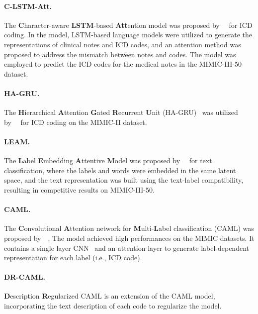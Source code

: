 \documentclass{article}
\begin{document}
\paragraph{C-LSTM-Att.} The \textbf{C}haracter-aware \textbf{LSTM}-based \textbf{Att}ention model was proposed by~\citeauthor{shi2017towards}~ for ICD coding. In the model, LSTM-based language models were utilized to generate the representations of clinical notes and ICD codes, and an attention method was proposed to address the mismatch between notes and codes. The model was employed to predict the ICD codes for the medical notes in the MIMIC-III-50 dataset.

\paragraph{HA-GRU.} The
\textbf{H}ierarchical \textbf{A}ttention \textbf{G}ated \textbf{R}ecurrent \textbf{U}nit (HA-GRU)~\cite{yang2016hierarchical} was utilized by~\citeauthor{baumel2018multi}~ for ICD coding  on the MIMIC-II dataset.

\paragraph{LEAM.} The \textbf{L}abel \textbf{E}mbedding \textbf{A}ttentive \textbf{M}odel was proposed by~\citeauthor{wang2018joint}~ for text classification, where the labels and words were embedded in the same latent space, and the text representation was built using the text-label compatibility, resulting in competitive results on MIMIC-III-50.

\paragraph{CAML.} The \textbf{C}onvolutional \textbf{A}ttention network for \textbf{M}ulti-\textbf{L}abel classification (CAML) was proposed by~\citeauthor{mullenbach2018}~. The model achieved high performances on the MIMIC datasets. It contains a single layer CNN~\cite{kim2014convolutional} and an attention layer to generate label-dependent representation for each label (i.e., ICD code).

\paragraph{DR-CAML.} \textbf{D}escription \textbf{R}egularized CAML \cite{mullenbach2018} is an extension of the CAML model, incorporating the text description of each code to regularize the model.
\end{document}
